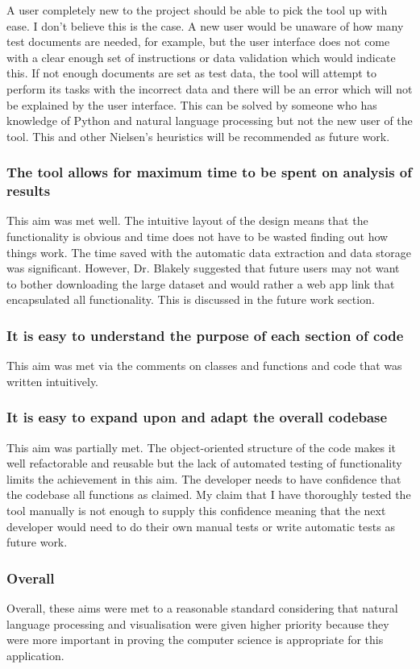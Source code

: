 				A user completely new to the project should be able to pick the tool up with ease. I don't believe this is the case. A new user would be unaware of how many test documents are needed, for example, but the user interface does not come with a clear enough set of instructions or data validation which would indicate this. If not enough documents are set as test data, the tool will attempt to perform its tasks with the incorrect data and there will be an error which will not be explained by the user interface. This can be solved by someone who has knowledge of Python and natural language processing but not the new user of the tool. This and other Nielsen's heuristics will be recommended as future work. 
			\subsubsection{The tool allows for maximum time to be spent on analysis of results}
				This aim was met well. The intuitive layout of the design means that the functionality is obvious and time does not have to be wasted finding out how things work. The time saved with the automatic data extraction and data storage was significant. However, Dr. Blakely suggested that future users may not want to bother downloading the large dataset and would rather a web app link that encapsulated all functionality. This is discussed in the future work section. 
			\subsubsection{It is easy to understand the purpose of each section of code}
				This aim was met via the comments on classes and functions and code that was written intuitively. 
			\subsubsection{It is easy to expand upon and adapt the overall codebase}
				This aim was partially met. The object-oriented structure of the code makes it well refactorable and reusable but the lack of automated testing of functionality limits the achievement in this aim. The developer needs to have confidence that the codebase all functions as claimed. My claim that I have thoroughly tested the tool manually is not enough to supply this confidence meaning that the next developer would need to do their own manual tests or write automatic tests as future work. 
			\subsubsection{Overall}
				Overall, these aims were met to a reasonable standard considering that natural language processing and visualisation were given higher priority because they were more important in proving the computer science is appropriate for this application.  
